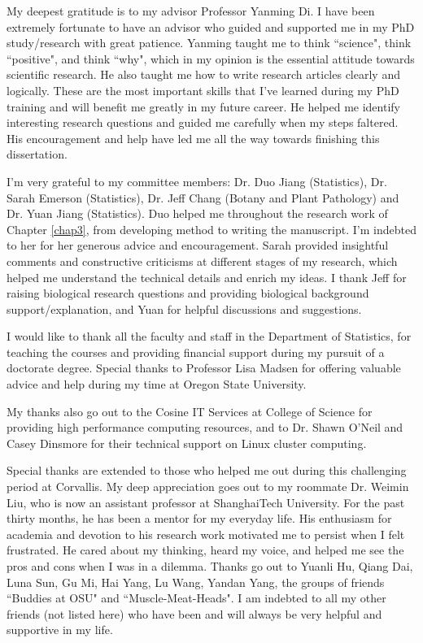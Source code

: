 
My deepest gratitude is to my advisor Professor Yanming Di. I have been extremely fortunate to have 
an advisor who guided and supported me in my PhD study/research with great patience. Yanming taught 
me to think ``science", think ``positive", and think ``why", which in my opinion is the essential 
attitude towards scientific research. He also taught me how to write research articles clearly and 
logically. These are the most important skills that I've learned during my PhD training and will 
benefit me greatly in my future career. He helped me identify interesting research questions and 
guided me carefully when my steps faltered. His encouragement and help have led me all the way 
towards finishing this dissertation.

I'm very grateful to my committee members: Dr. Duo Jiang (Statistics), Dr. Sarah Emerson 
(Statistics),  Dr. Jeff Chang (Botany and Plant Pathology) and Dr. Yuan Jiang (Statistics). Duo 
helped me throughout the research work of Chapter \ref{chap3}, from developing method to writing 
the manuscript. I'm indebted to her for her generous advice and encouragement. Sarah provided 
insightful comments and constructive criticisms at different stages of my research, which helped me 
understand the technical details and enrich my ideas. I thank Jeff for raising biological research 
questions and providing biological background support/explanation, and Yuan for helpful discussions 
and suggestions. 

I would like to thank all the faculty and staff in the Department of Statistics, for teaching 
the courses and providing financial support during my pursuit of a doctorate degree. Special 
thanks to Professor Lisa Madsen for offering valuable advice and help during my time at Oregon 
State University. 

My thanks also go out to the Cosine IT Services at College of Science for providing high 
performance computing resources, and to Dr. Shawn O'Neil and Casey Dinsmore for their technical 
support on Linux cluster computing. 

Special thanks are extended to those who helped me out during this challenging period at Corvallis. 
My deep appreciation goes out to my roommate Dr. Weimin Liu, who is now an assistant professor at 
ShanghaiTech University. For the past thirty months, he has been a mentor for my everyday life. His 
enthusiasm for academia and devotion to his research work motivated me to persist when I felt 
frustrated. He cared about my thinking, heard my voice, and helped me see the pros and cons when I 
was in a dilemma. Thanks go out to Yuanli Hu, Qiang Dai, Luna Sun, Gu Mi, Hai Yang, Lu Wang, Yandan 
Yang, the groups of friends ``Buddies at OSU" and ``Muscle-Meat-Heads". I am indebted to all my 
other friends (not listed here) who have been and will always be very helpful and supportive in my 
life.


